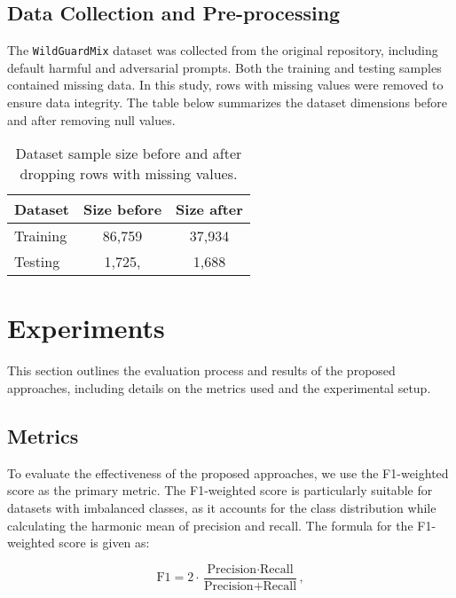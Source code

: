 \documentclass{article}
\begin{document}
\subsection{Data Collection and Pre-processing}

The \texttt{WildGuardMix} dataset was collected from the original repository, including default harmful and adversarial prompts.  
Both the training and testing samples contained missing data. In this study, rows with missing values were removed to ensure data integrity. The table below summarizes the dataset dimensions before and after removing null values.

\begin{table}[h!]
\centering
\begin{tabular}{|l|c|c|}
\hline
\textbf{Dataset} & \textbf{Size before} & \textbf{Size after} \\ \hline
Training         & 86,759                          & 37,934                         \\ \hline
Testing          & 1,725,                          & 1,688                         \\ \hline
\end{tabular}
\caption{Dataset sample size before and after dropping rows with missing values.}
\label{tab:dataset_shapes}
\end{table}


\section{Experiments}

This section outlines the evaluation process and results of the proposed approaches, including details on the metrics used and the experimental setup.

\subsection{Metrics}

To evaluate the effectiveness of the proposed approaches, we use the F1-weighted score as the primary metric. The F1-weighted score is particularly suitable for datasets with imbalanced classes, as it accounts for the class distribution while calculating the harmonic mean of precision and recall. The formula for the F1-weighted score is given as:

\begin{equation}
\text{F1} = 2 \cdot \frac{\text{Precision} \cdot \text{Recall}}{\text{Precision} + \text{Recall}},
\end{equation}
\end{document}
